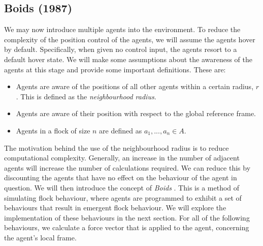 \documentclass[12pt]{article}
\begin{document}
\subsection{Boids (1987)}
We may now introduce multiple agents into the environment. To reduce the complexity of the position control of the agents, we will assume the agents hover by default. Specifically, when given no control input, the agents resort to a default hover state. We will make some assumptions about the awareness of the agents at this stage and provide some important definitions.
These are:
\begin{itemize}
    \item Agents are aware of the positions of all other agents within a certain radius, $r$. This is defined as the \emph{neighbourhood radius}.
    \item Agents are aware of their position with respect to the global reference frame.
    \item Agents in a flock of size $n$ are defined as $a_1,...,a_n \in A$.
\end{itemize}

The motivation behind the use of the neighbourhood radius is to reduce computational complexity. Generally, an increase in the number of adjacent agents will increase the number of calculations required. We can reduce this by discounting the agents that have no effect on the behaviour of the agent in question. We will then introduce the concept of \emph{Boids} \cite{Reynolds}. This is a method of simulating flock behaviour, where agents are programmed to exhibit a set of behaviours that result in emergent flock behaviour. We will explore the implementation of these behaviours in the next section. For all of the following behaviours, we calculate a force vector that is applied to the agent, concerning the agent's local frame.
\end{document}
